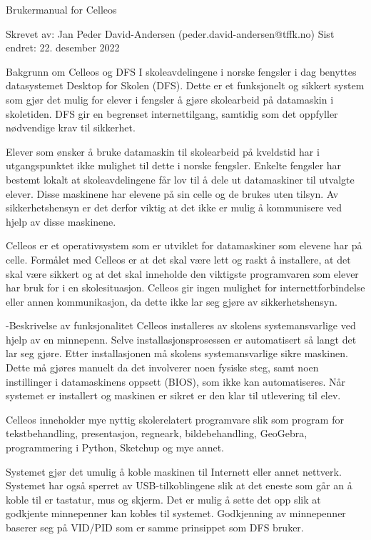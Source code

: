 Brukermanual for Celleos

Skrevet av: Jan Peder David-Andersen (peder.david-andersen@tffk.no)
Sist endret: 22. desember 2022

Bakgrunn om Celleos og DFS
I skoleavdelingene i norske fengsler i dag benyttes datasystemet Desktop for Skolen (DFS). Dette er et funksjonelt og sikkert system som gjør det mulig for elever i fengsler å gjøre skolearbeid på datamaskin i skoletiden. DFS gir en begrenset internettilgang, samtidig som det oppfyller nødvendige krav til sikkerhet.

Elever som ønsker å bruke datamaskin til skolearbeid på kveldstid har i utgangspunktet ikke mulighet til dette i norske fengsler. Enkelte fengsler har bestemt lokalt at skoleavdelingene får lov til å dele ut datamaskiner til utvalgte elever. Disse maskinene har elevene på sin celle og de brukes uten tilsyn. Av sikkerhetshensyn er det derfor viktig at det ikke er mulig å kommunisere ved hjelp av disse maskinene.

Celleos er et operativsystem som er utviklet for datamaskiner som elevene har på celle. Formålet med Celleos er at det skal være lett og raskt å installere, at det skal være sikkert og at det skal inneholde den viktigste programvaren som elever har bruk for i en skolesituasjon. Celleos gir ingen mulighet for internettforbindelse eller annen kommunikasjon, da dette ikke lar seg gjøre av sikkerhetshensyn.

-Beskrivelse av funksjonalitet
Celleos installeres av skolens systemansvarlige ved hjelp av en minnepenn. Selve installasjonsprosessen er automatisert så langt det lar seg gjøre. Etter installasjonen må skolens systemansvarlige sikre maskinen. Dette må gjøres manuelt da det involverer noen fysiske steg, samt noen instillinger i datamaskinens oppsett (BIOS), som ikke kan automatiseres. Når systemet er installert og maskinen er sikret er den klar til utlevering til elev.

Celleos inneholder mye nyttig skolerelatert programvare slik som program for tekstbehandling, presentasjon, regneark, bildebehandling, GeoGebra, programmering i Python, Sketchup og mye annet.

Systemet gjør det umulig å koble maskinen til Internett eller annet nettverk. Systemet har også sperret av USB-tilkoblingene slik at det eneste som går an å koble til er tastatur, mus og skjerm. Det er mulig å sette det opp slik at godkjente minnepenner kan kobles til systemet. Godkjenning av minnepenner baserer seg på VID/PID som er samme prinsippet som DFS bruker.

